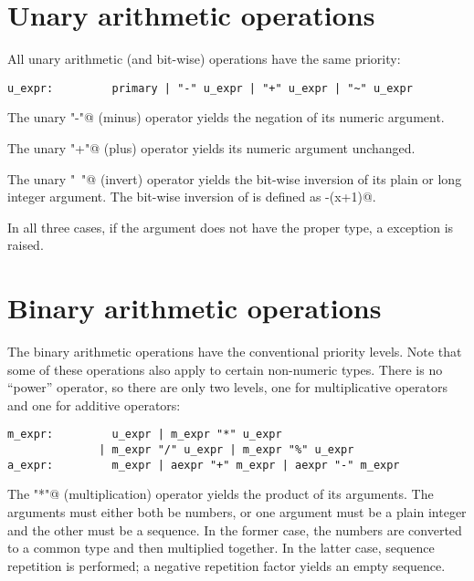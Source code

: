 \section{Unary arithmetic operations}

All unary arithmetic (and bit-wise) operations have the same priority:

\begin{verbatim}
u_expr:         primary | "-" u_expr | "+" u_expr | "~" u_expr
\end{verbatim}

The unary \verb@"-"@ (minus) operator yields the negation of its
numeric argument.

The unary \verb@"+"@ (plus) operator yields its numeric argument
unchanged.

The unary \verb@"~"@ (invert) operator yields the bit-wise inversion
of its plain or long integer argument.  The bit-wise inversion of
\verb@x@ is defined as \verb@-(x+1)@.

In all three cases, if the argument does not have the proper type,
a \verb@TypeError@ exception is raised.

\section{Binary arithmetic operations}

The binary arithmetic operations have the conventional priority
levels.  Note that some of these operations also apply to certain
non-numeric types.  There is no ``power'' operator, so there are only
two levels, one for multiplicative operators and one for additive
operators:

\begin{verbatim}
m_expr:         u_expr | m_expr "*" u_expr
              | m_expr "/" u_expr | m_expr "%" u_expr
a_expr:         m_expr | aexpr "+" m_expr | aexpr "-" m_expr
\end{verbatim}

The \verb@"*"@ (multiplication) operator yields the product of its
arguments.  The arguments must either both be numbers, or one argument
must be a plain integer and the other must be a sequence.  In the
former case, the numbers are converted to a common type and then
multiplied together.  In the latter case, sequence repetition is
performed; a negative repetition factor yields an empty sequence.

